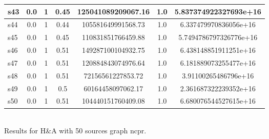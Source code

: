 \documentclass{article}
\begin{document}
\begin{tabular}{|l|c|c|c|c|c|c|}
\hline
s43 &0.0 & 1 & 0.45 & 125041089209067.16 & 1.0 & 5.837374922327693e+16\\
\hline
s44 &0.0 & 1 & 0.44 & 105581649991568.73 & 1.0 & 6.337479970836056e+16\\
\hline
s45 &0.0 & 1 & 0.45 & 110831851766459.88 & 1.0 & 5.7494786797326776e+16\\
\hline
s46 &0.0 & 1 & 0.51 & 149287100104932.75 & 1.0 & 6.438148851911251e+16\\
\hline
s47 &0.0 & 1 & 0.51 & 120884843074976.64 & 1.0 & 6.181889073255477e+16\\
\hline
s48 &0.0 & 1 & 0.51 & 72156561227853.72 & 1.0 & 3.91100265486796e+16\\
\hline
s49 &0.0 & 1 & 0.5 & 60164458097062.17 & 1.0 & 2.361687322239352e+16\\
\hline
s50 &0.0 & 1 & 0.51 & 104440151760409.08 & 1.0 & 6.680076544527615e+16\\
\hline
\end{tabular}\\

\noindent Results for H\&A with 50 sources graph ncpr.
\end{document}
